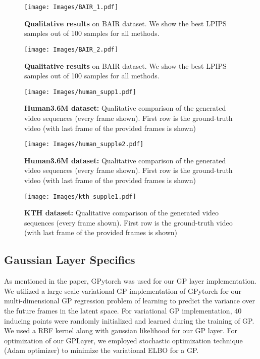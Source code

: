 \documentclass{article} \usepackage{iclr2021_conference,times}
\begin{document}
\begin{figure}[t!]
    \centering
    \begin{minipage}{.48\linewidth}
        \centering
        \texttt{[image: Images/BAIR\_1.pdf]}
        \caption{\textbf{Qualitative results} on BAIR dataset. We show the best LPIPS samples out of 100 samples for all methods.}
        \label{fig:bairsup1}
    \end{minipage}\hfill
    \begin{minipage}{0.48\linewidth}
        \centering
        \texttt{[image: Images/BAIR\_2.pdf]}
        \caption{\textbf{Qualitative results} on BAIR dataset. We show the best LPIPS samples out of 100 samples for all methods.}
        \label{fig:bairsup2}
    \end{minipage}
\end{figure}
\begin{figure}[t!]
    \centering
    \begin{minipage}{.48\linewidth}
        \centering
        \texttt{[image: Images/human\_supp1.pdf]}
        \caption{\textbf{Human3.6M dataset:} Qualitative comparison of the generated video sequences (every  frame shown). First row is the ground-truth video (with last frame of the provided  frames is shown)}
        \label{fig:humansup1}
    \end{minipage}\hfill
    \begin{minipage}{0.48\linewidth}
        \centering
        \texttt{[image: Images/human\_supple2.pdf]}
        \caption{\textbf{Human3.6M dataset:} Qualitative comparison of the generated video sequences (every  frame shown). First row is the ground-truth video (with last frame of the provided  frames is shown)}
        \label{fig:humansup2}
    \end{minipage}
\end{figure}



\clearpage
\begin{figure}[t]
    \centering
\texttt{[image: Images/kth\_supple1.pdf]}
    \caption{\textbf{KTH dataset:} Qualitative comparison of the generated video sequences (every  frame shown). First row is the ground-truth video (with last frame of the provided  frames is shown)}
    \label{fig:kthsup1}
\end{figure}



\subsection{Gaussian Layer Specifics}
As mentioned in the paper, GPytorch was used for our GP layer implementation. We utilized a large-scale variational GP implementation of GPytorch for our multi-dimensional GP regression problem of learning to predict the variance over the future frames in the latent space. For variational GP implementation, 40 inducing points were randomly initialized and learned during the training of GP. We used a RBF kernel along with gaussian likelihood for our GP layer. For optimization of our GPLayer, we employed stochastic optimization technique (Adam optimizer) to minimize the variational ELBO for a GP.
\end{document}
